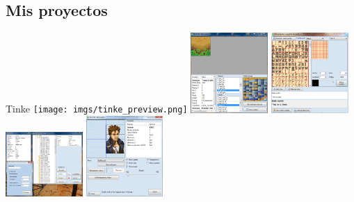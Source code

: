 \subsection{Mis proyectos}
\begin{frame}{Tinke}
    \centering
    \texttt{[image: imgs/tinke\_preview.png]}
    \vfill
    \includegraphics[width=0.22\textwidth]{imgs/tinke1.png}
    \hfill
    \includegraphics[width=0.22\textwidth]{imgs/tinke2.png}
    \hfill
    \includegraphics[width=0.22\textwidth]{imgs/tinke3.png}
    \hfill
    \includegraphics[width=0.22\textwidth]{imgs/tinke4.png}
\end{frame}

